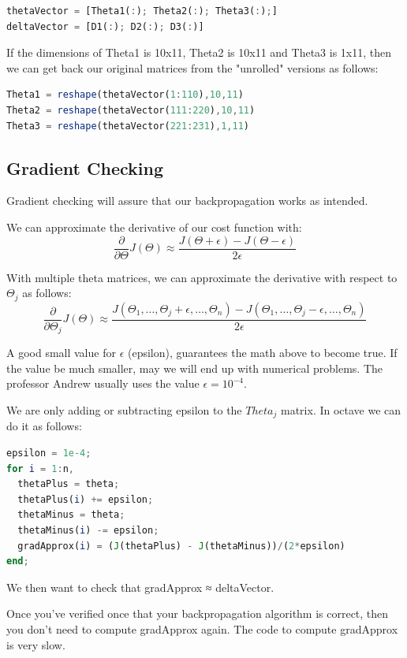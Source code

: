 \documentclass{report}
\begin{document}
\begin{lstlisting}[language=Octave]
thetaVector = [Theta1(:); Theta2(:); Theta3(:);]
deltaVector = [D1(:); D2(:); D3(:)]
\end{lstlisting}

If the dimensions of Theta1 is 10x11, Theta2 is 10x11 and Theta3 is 1x11, then we can get back our original matrices from the "unrolled" versions as follows:

\begin{lstlisting}[language=Octave]
Theta1 = reshape(thetaVector(1:110),10,11)
Theta2 = reshape(thetaVector(111:220),10,11)
Theta3 = reshape(thetaVector(221:231),1,11)
\end{lstlisting}

\subsection{Gradient Checking}
Gradient checking will assure that our backpropagation works as intended.

We can approximate the derivative of our cost function with:
$$\dfrac{\partial}{\partial\Theta}J(\Theta) \approx \dfrac{J(\Theta + \epsilon) - J(\Theta - \epsilon)}{2\epsilon}$$

With multiple theta matrices, we can approximate the derivative with respect to $\Theta_j$ as follows:
$$\dfrac{\partial}{\partial\Theta_j}J(\Theta) \approx \dfrac{J(\Theta_1, \dots, \Theta_j + \epsilon, \dots, \Theta_n) - J(\Theta_1, \dots, \Theta_j - \epsilon, \dots, \Theta_n)}{2\epsilon}$$

A good small value for ${\epsilon}$ (epsilon), guarantees the math above to become true. If the value be much smaller, may we will end up with numerical problems. The professor Andrew usually uses the value ${\epsilon = 10^{-4}}$.

We are only adding or subtracting epsilon to the $Theta_j$ matrix. In octave we can do it as follows:

\begin{lstlisting}[language=Octave]
epsilon = 1e-4;
for i = 1:n,
  thetaPlus = theta;
  thetaPlus(i) += epsilon;
  thetaMinus = theta;
  thetaMinus(i) -= epsilon;
  gradApprox(i) = (J(thetaPlus) - J(thetaMinus))/(2*epsilon)
end;
\end{lstlisting}

We then want to check that gradApprox ≈ deltaVector.

Once you've verified once that your backpropagation algorithm is correct, then you don't need to compute gradApprox again. The code to compute gradApprox is very slow.
\end{document}
